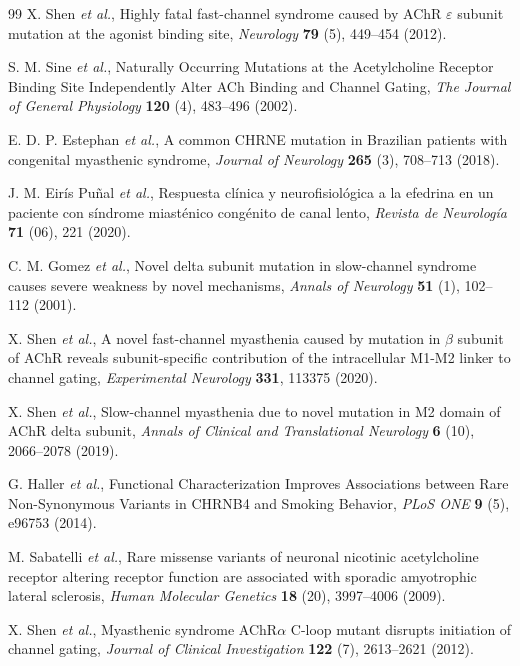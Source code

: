 \documentclass{ws-procs11x85}
\begin{document}
\begin{thebibliography}{99}
X. Shen {\em et al.}, Highly fatal fast-channel syndrome caused by AChR $\varepsilon$ subunit mutation at the agonist binding site, {\em Neurology} {\bf 79} (5), 449--454 (2012).

S. M. Sine {\em et al.}, Naturally Occurring Mutations at the Acetylcholine Receptor Binding Site Independently Alter ACh Binding and Channel Gating, {\em The Journal of General Physiology} {\bf 120} (4), 483--496 (2002).

E. D. P. Estephan {\em et al.}, A common CHRNE mutation in Brazilian patients with congenital myasthenic syndrome, {\em Journal of Neurology} {\bf 265} (3), 708--713 (2018).

J. M. Eir{\'i}s Pu{\~n}al {\em et al.}, Respuesta cl{\'i}nica y neurofisiol{\'o}gica a la efedrina en un paciente con s{\'i}ndrome miast{\'e}nico cong{\'e}nito de canal lento, {\em Revista de Neurolog{\'i}a} {\bf 71} (06), 221 (2020).

C. M. Gomez {\em et al.}, Novel delta subunit mutation in slow-channel syndrome causes severe weakness by novel mechanisms, {\em Annals of Neurology} {\bf 51} (1), 102--112 (2001).

X. Shen {\em et al.}, A novel fast-channel myasthenia caused by mutation in $\beta$ subunit of AChR reveals subunit-specific contribution of the intracellular M1-M2 linker to channel gating, {\em Experimental Neurology} {\bf 331}, 113375 (2020).

X. Shen {\em et al.}, Slow-channel myasthenia due to novel mutation in M2 domain of AChR delta subunit, {\em Annals of Clinical and Translational Neurology} {\bf 6} (10), 2066--2078 (2019).

G. Haller {\em et al.}, Functional Characterization Improves Associations between Rare Non-Synonymous Variants in CHRNB4 and Smoking Behavior, {\em PLoS ONE} {\bf 9} (5), e96753 (2014).

M. Sabatelli {\em et al.}, Rare missense variants of neuronal nicotinic acetylcholine receptor altering receptor function are associated with sporadic amyotrophic lateral sclerosis, {\em Human Molecular Genetics} {\bf 18} (20), 3997--4006 (2009).

X. Shen {\em et al.}, Myasthenic syndrome AChR$\alpha$ C-loop mutant disrupts initiation of channel gating, {\em Journal of Clinical Investigation} {\bf 122} (7), 2613--2621 (2012).


\end{thebibliography}
\end{document}

